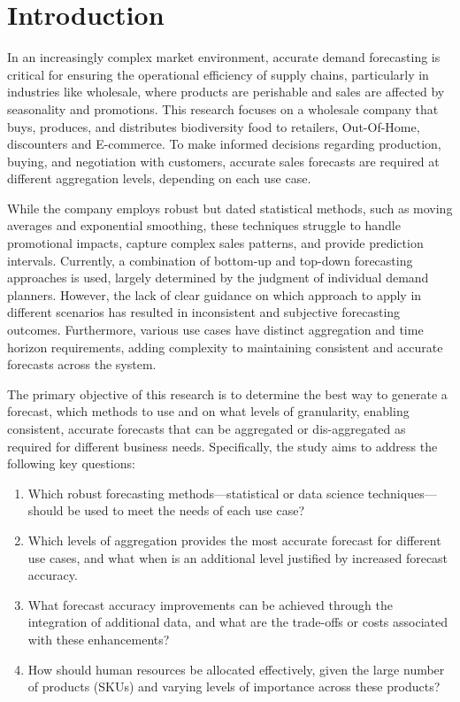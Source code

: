 \documentclass[
  american,
  10,
  a4paper,
]{book}
\providecommand{\tightlist}{%
  \setlength{\itemsep}{0pt}\setlength{\parskip}{0pt}}
\theoremstyle{definition}
\theoremstyle{remark}
\begin{document}
\chapter{Introduction}\label{sec-00-introduction}

In an increasingly complex market environment, accurate demand
forecasting is critical for ensuring the operational efficiency of
supply chains, particularly in industries like wholesale, where products
are perishable and sales are affected by seasonality and promotions.
This research focuses on a wholesale company that buys, produces, and
distributes biodiversity food to retailers, Out-Of-Home, discounters and
E-commerce. To make informed decisions regarding production, buying, and
negotiation with customers, accurate sales forecasts are required at
different aggregation levels, depending on each use case.

While the company employs robust but dated statistical methods, such as
moving averages and exponential smoothing, these techniques struggle to
handle promotional impacts, capture complex sales patterns, and provide
prediction intervals. Currently, a combination of bottom-up and top-down
forecasting approaches is used, largely determined by the judgment of
individual demand planners. However, the lack of clear guidance on which
approach to apply in different scenarios has resulted in inconsistent
and subjective forecasting outcomes. Furthermore, various use cases have
distinct aggregation and time horizon requirements, adding complexity to
maintaining consistent and accurate forecasts across the system.

The primary objective of this research is to determine the best way to
generate a forecast, which methods to use and on what levels of
granularity, enabling consistent, accurate forecasts that can be
aggregated or dis-aggregated as required for different business needs.
Specifically, the study aims to address the following key questions:

\begin{enumerate}
\def\labelenumi{\arabic{enumi}.}
\tightlist
\item
  Which robust forecasting methods---statistical or data science
  techniques---should be used to meet the needs of each use case?
\item
  Which levels of aggregation provides the most accurate forecast for
  different use cases, and what when is an additional level justified by
  increased forecast accuracy.
\item
  What forecast accuracy improvements can be achieved through the
  integration of additional data, and what are the trade-offs or costs
  associated with these enhancements?
\item
  How should human resources be allocated effectively, given the large
  number of products (SKUs) and varying levels of importance across
  these products?
\end{enumerate}
\end{document}
